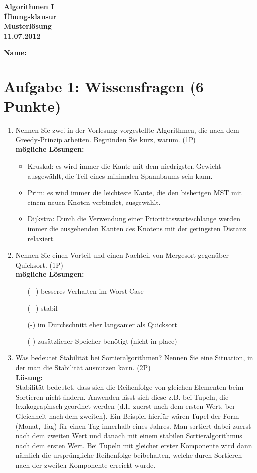\documentclass{scrartcl}
\begin{document}
\TabPositions{0.8cm, 1.6cm, 2.4cm, 3.2cm}

\begin{center}
	{\huge \textbf{Algorithmen I} \\
			\textbf{Übungsklausur}\\
			\textbf{Musterlösung} \\
			\textbf{11.07.2012}}
\end{center}
\textbf{Name:}\\
\section*{Aufgabe 1: Wissensfragen (6 Punkte)}
\begin{enumerate}[(1)]
\item Nennen Sie zwei in der Vorlesung vorgestellte Algorithmen, die nach dem Greedy-Prinzip arbeiten. Begründen Sie kurz, warum. (1P)\\
\textbf{mögliche Lösungen:}
\begin{itemize}
\item Kruskal: es wird immer die Kante mit dem niedrigsten Gewicht ausgewählt, die Teil eines minimalen Spannbaums sein kann.
\item Prim: es wird immer die leichteste Kante, die den bisherigen MST mit einem neuen Knoten verbindet, ausgewählt.
\item Dijkstra: Durch die Verwendung einer Prioritätswarteschlange werden immer die ausgehenden Kanten des Knotens mit der geringsten Distanz relaxiert.
\end{itemize}

\item Nennen Sie einen Vorteil und einen Nachteil von Mergesort gegenüber Quicksort. (1P)\\
\textbf{mögliche Lösungen:}
\begin{itemize}
\item[(+)] besseres Verhalten im Worst Case
\item[(+)] stabil
\item[(-)] im Durchschnitt eher langsamer als Quicksort
\item[(-)] zusätzlicher Speicher benötigt (nicht in-place)
\end{itemize}

\item Was bedeutet Stabilität bei Sortieralgorithmen? Nennen Sie eine Situation, in der man die Stabilität ausnutzen kann. (2P)\\
\textbf{Lösung:}\\
Stabilität bedeutet, dass sich die Reihenfolge von gleichen Elementen beim Sortieren nicht ändern. Anwenden lässt sich diese z.B. bei Tupeln, die lexikographisch geordnet werden (d.h. zuerst nach dem ersten Wert, bei Gleichheit nach dem zweiten). Ein Beispiel hierfür wären Tupel der Form (Monat, Tag) für einen Tag innerhalb eines Jahres. Man sortiert dabei zuerst nach dem zweiten Wert und danach mit einem stabilen Sortieralgorithmus nach dem ersten Wert. Bei Tupeln mit gleicher erster Komponente wird dann nämlich die ursprüngliche Reihenfolge beibehalten, welche durch Sortieren nach der zweiten Komponente erreicht wurde.


\end{enumerate}
\end{document}
